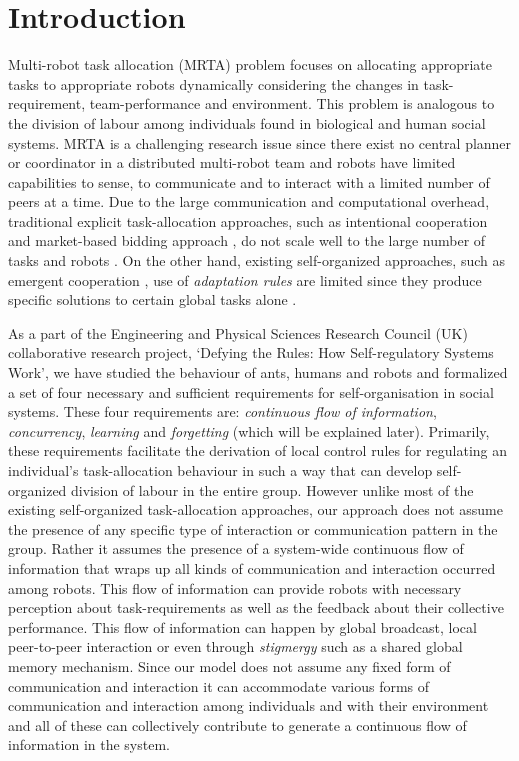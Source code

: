 \documentclass[smallcondensed]{svjour3}
\begin{document}
\section{Introduction}
\label{sec:intro}
Multi-robot task allocation (MRTA) problem focuses on allocating appropriate tasks to appropriate robots dynamically considering the changes in task-requirement, team-performance and environment. This problem is analogous to the division of labour among individuals found in biological and human social systems. MRTA is a challenging research issue since there exist no central planner or coordinator in a distributed multi-robot team and robots have limited capabilities to sense, to communicate and to interact with a limited number of peers at a time. Due to the large communication and computational overhead, traditional explicit task-allocation approaches, such as intentional cooperation \citep{Parker2008} and market-based bidding approach \citep{Dias+2006},  do not scale well to the large number of tasks and robots \citep{Lerman+2006}. On the other hand, existing self-organized approaches, such as emergent cooperation \citep{Kube1997}, use of {\em adaptation rules} \citep{Liu+2007} are limited since they produce specific solutions to certain global tasks alone \citep{Gerkey+2004}.

As a part of the Engineering and Physical Sciences Research Council (UK) collaborative  research project, `Defying the Rules: How Self-regulatory Systems Work', we have studied the behaviour of ants, humans and robots and formalized a set of four necessary and sufficient requirements for self-organisation in social systems. These four requirements are: \textit{continuous flow of information}, \textit{concurrency}, \textit{learning} and \textit{forgetting} (which will be explained later).  Primarily, these requirements facilitate the derivation of local control rules for regulating an individual's task-allocation behaviour in such a way that can develop self-organized division of labour in the entire group. However  unlike  most of the existing self-organized task-allocation approaches, our approach does not assume the presence of any specific type of interaction or communication pattern in the group. Rather it assumes the presence of a system-wide continuous flow of information that wraps up all kinds of communication and interaction occurred among robots. This flow of information can provide robots with necessary perception about task-requirements as well as the feedback about their collective performance. This flow of information can happen by global broadcast, local peer-to-peer interaction or even through \textit{stigmergy} such as a shared global memory mechanism. Since our model does not assume any fixed form of communication and interaction it can accommodate various forms of communication and interaction among individuals and with their environment and all of these can collectively contribute to generate a continuous flow of information in the system.
\end{document}
